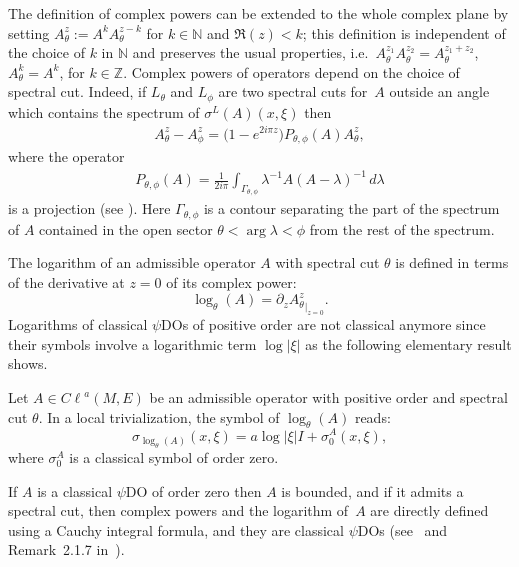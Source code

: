 \documentclass[pdftex]{sigma}
\newcommand{\N}{{\mathbb N}}
\newcommand{\Z}{{\mathbb Z}}
\def \Cl {{C\ell}}
\begin{document}
The def\/inition of complex powers can be extended to the whole complex plane by setting $A_{\theta}^z:=A^kA_{\theta}^{z-k}$ for $k\in \N$ and $\Re(z)<k$; this def\/inition is independent of the choice of $k$ in $\N$ and preserves the usual properties, i.e.\ $A_{\theta}^{z_1}A_{\theta}^{z_2}=A_{\theta}^{z_1+z_2}$, $A_{\theta}^k=A^k$, for $k\in\Z$.
Complex powers of operators depend on the choice of spectral cut. Indeed, if $L_{\theta}$ and $L_{\phi}$ are two spectral cuts for~$A$ outside an angle which contains the spectrum of $\sigma^L(A)(x,\xi)$ then
\begin{gather}
A_\theta^z-A_\phi^z=\big(1-e^{2i\pi z} \big)  P_{\theta, \phi} (A) A_\theta^z, \label{eq:DifferenceComplexPowers}
\end{gather}
where the operator
\begin{gather}
 P_{\theta, \phi} (A)=\frac{1}{2i\pi} \int_{\Gamma_{\theta,\phi}}\lambda^{-1}A(A-\lambda)^{-1}\,d\lambda \label{projection}
\end{gather}
is a projection (see \cite{PongeAsymmetry, WodzickiThesis}). Here $\Gamma_{\theta,\phi}$ is a contour separating the part of the spectrum of $A$ contained in the open sector $\theta<\arg\lambda<\phi$ from the rest of the spectrum.

The logarithm  of an admissible operator $A$ with spectral cut $\theta$  is def\/ined in terms of the derivative at $z=0$ of its complex power:
\[
\log_\theta(A)= \partial_z {A_\theta^{z}} _{\vert_{z=0}}.
\]
Logarithms of classical $\psi$DOs of positive order are not classical anymore since their symbols involve a logarithmic term $\log\vert \xi\vert$ as the following elementary result shows.

\begin{proposition}\label{prop:leadsymbolsigmathetaA}
Let $A\in \Cl^{a}(M, E)$ be an admissible operator with positive order and spectral cut $\theta$. In a local trivialization, the symbol of $\log_\theta(A)$ reads:
\[
\sigma_{\log_\theta(A)}(x, \xi)=a  \log \vert \xi\vert  I +\sigma_0^A(x,\xi),
\]
where $\sigma_0^A$ is a classical symbol of order zero.
\end{proposition}

\begin{remark}
If $A$ is a classical $\psi$DO of order zero then $A$ is bounded, and if it admits a spectral cut, then complex powers and the logarithm of~$A$ are directly def\/ined using a Cauchy integral formula, and they are classical $\psi$DOs (see~\cite{okikiolu} and Remark~2.1.7 in~\cite{ouedraogothese}).
\end{remark}
\end{document}

